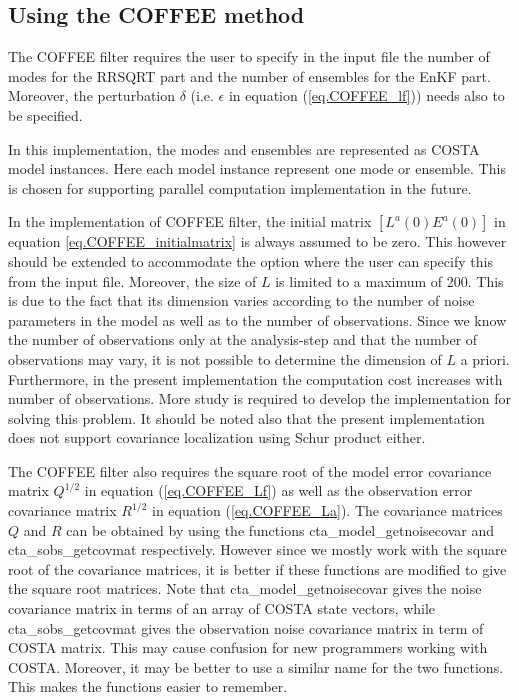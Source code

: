 \subsection{Using the COFFEE method}
The COFFEE filter requires the user to specify in the input file the number of
modes for the RRSQRT part and the number of ensembles for the EnKF part.
Moreover, the perturbation $\delta$ (i.e. $\epsilon$ in equation
(\ref{eq.COFFEE_lf})) needs also to be specified.

In this implementation, the modes and ensembles are represented as COSTA model
instances. Here each model instance represent one mode or ensemble. This is
chosen for supporting parallel computation implementation in the future.

In the implementation of COFFEE filter, the initial matrix $[L^a(0) E^a(0)]$ in
equation \ref{eq.COFFEE_initialmatrix} is always assumed to be zero. This
however should be extended to accommodate the option where the user can specify
this from the input file. Moreover, the size of $L$ is limited to a maximum of
200. This is due to the fact that its dimension varies according to the number
of noise parameters in the model as well as to the number of observations.
Since we know the number of observations only at the analysis-step and that the
number of observations may vary, it is not possible to determine the dimension
of $L$ a priori. Furthermore, in the present implementation the computation
cost increases with number of observations. More study is required to develop
the implementation for solving this problem. It should be noted also that the
present implementation does not support covariance localization using Schur
product either.

The COFFEE filter also requires the square root of the model error covariance
matrix $Q^{1/2}$ in equation (\ref{eq.COFFEE_Lf}) as well as the observation
error covariance matrix $R^{1/2}$ in equation (\ref{eq.COFFEE_La}). The
covariance matrices $Q$ and $R$ can be obtained by using the functions
cta\_model\_getnoisecovar and cta\_sobs\_getcovmat respectively. However since
we mostly work with the square root of the covariance matrices, it is better if
these functions are modified to give the square root matrices. Note that
cta\_model\_getnoisecovar gives the noise covariance matrix in terms of an
array of COSTA state vectors, while cta\_sobs\_getcovmat gives the observation
noise covariance matrix in term of COSTA matrix. This may cause confusion for
new programmers working with COSTA. Moreover, it may be better to use a similar
name for the two functions. This makes the functions easier to remember.

